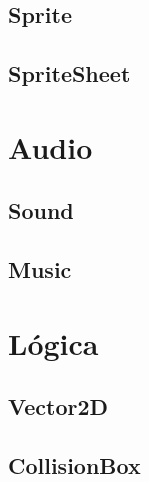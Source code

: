 \documentclass[parskip=half*]{scrartcl}
\begin{document}
	\subsection{Sprite}

	\subsection{SpriteSheet}


\newpage
\section{Audio}
	\subsection{Sound}

	\subsection{Music}


\newpage
\section{L\'ogica}
	\subsection{Vector2D}

	\subsection{CollisionBox}


\end{document}
